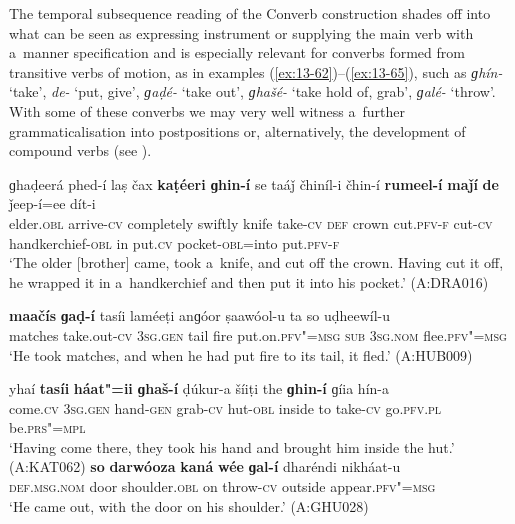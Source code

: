  The temporal subsequence reading of the Converb construction shades off into what can be seen as expressing instrument or supplying the main verb with a~manner specification and is especially relevant for converbs formed from transitive verbs of motion, as in examples (\ref{ex:13-62})--(\ref{ex:13-65}), such as \textit{ɡhín-} `take', \textit{de-} `put, give', \textit{ɡaḍé-} `take out', \textit{ɡhašé-} `take hold of, grab', \textit{ɡalé-} `throw'. With some of these converbs we may very well witness a~further grammaticalisation into postpositions or, alternatively, the development of compound verbs (see ). 

\ea
\label{ex:13-62}
\gll ɡhaḍeerá phed-í laṣ čax \textbf{kaṭéeri} \textbf{ɡhin-í} se taáǰ čhiníl-i čhin-í \textbf{rumeel-í} \textbf{maǰí} \textbf{de} ǰeep-í=ee dít-i \\
elder.\textsc{obl} arrive-\textsc{cv} completely swiftly knife take-\textsc{cv} \textsc{def} crown cut.\textsc{pfv-f} cut-\textsc{cv} handkerchief-\textsc{obl} in put.\textsc{cv} pocket-\textsc{obl}=into put.\textsc{pfv-f} \\
\glt `The older [brother] came, took a~knife, and cut off the crown. Having cut it off, he wrapped it in a~handkerchief and then put it into his pocket.' (A:DRA016)

\ex
\label{ex:13-63}
\gll \textbf{maačís} \textbf{ɡaḍ-í} tasíi laméeṭi anɡóor ṣaawóol-u ta so uḍheewíl-u \\
matches take.out-\textsc{cv} \textsc{3sg.gen} tail fire put.on.\textsc{pfv"=msg}  \textsc{sub } \textsc{3sg.nom} flee.\textsc{pfv"=msg} \\
\glt `He took matches, and when he had put fire to its tail, it fled.' (A:HUB009)

\ex
\label{ex:13-64}
\gll yhaí \textbf{tasíi} \textbf{háat"=ii} \textbf{ɡhaš-í} ḍúkur-a šíiṭi the \textbf{ɡhin-í} ɡíia hín-a  \\
come.\textsc{cv} \textsc{3sg.gen} hand-\textsc{gen} grab-\textsc{cv} hut-\textsc{obl} inside to  take-\textsc{cv} go.\textsc{pfv.pl} be.\textsc{prs"=mpl} \\
\glt `Having come there, they took his hand and brought him inside the hut.' (A:KAT062)
\ex
\label{ex:13-65}
\gll \textbf{so} \textbf{darwóoza} \textbf{kaná} \textbf{wée} \textbf{ɡal-í} dharéndi nikháat-u\\
\textsc{def.msg.nom} door shoulder.\textsc{obl} on throw-\textsc{cv} outside appear.\textsc{pfv"=msg}\\
\glt `He came out, with the door on his shoulder.' (A:GHU028) 
\z

